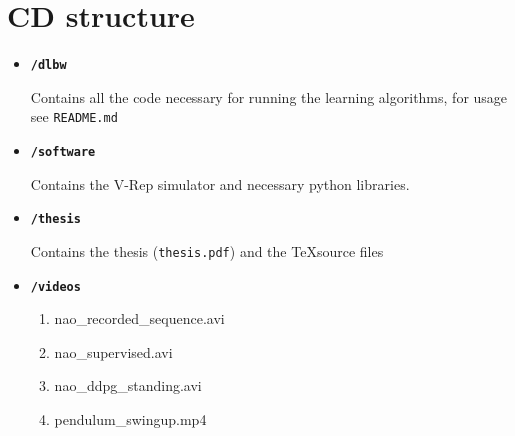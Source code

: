 \chapter{CD structure}

\begin{itemize}
\item \texttt{\textbf{/dlbw}}

Contains all the code necessary for running the learning algorithms, for usage see \texttt{README.md}

\item \texttt{\textbf{/software}}

Contains the V-Rep simulator and necessary python libraries.
\item \texttt{\textbf{/thesis}}


Contains the thesis (\texttt{thesis.pdf}) and the \TeX source files
\item \texttt{\textbf{/videos}}
\begin{enumerate}
\item nao\_recorded\_sequence.avi \label{video:sequence}
\item nao\_supervised.avi \label{video:supervised}
\item nao\_ddpg\_standing.avi \label{video:standing}
\item pendulum\_swingup.mp4 \label{video:swingup}
\end{enumerate}
\end{itemize}
